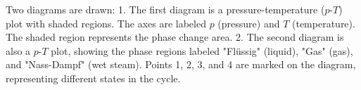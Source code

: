 Two diagrams are drawn:  
1. The first diagram is a pressure-temperature (\(p\)-\(T\)) plot with shaded regions. The axes are labeled \(p\) (pressure) and \(T\) (temperature). The shaded region represents the phase change area.  
2. The second diagram is also a \(p\)-\(T\) plot, showing the phase regions labeled "Flüssig" (liquid), "Gas" (gas), and "Nass-Dampf" (wet steam). Points 1, 2, 3, and 4 are marked on the diagram, representing different states in the cycle.